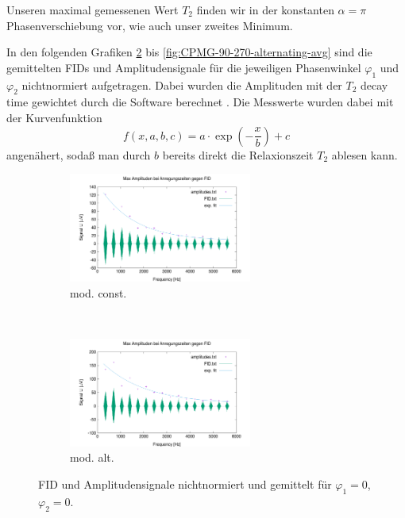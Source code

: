 \documentclass[../../main.tex]{subfiles}
\begin{document}
            Unseren maximal gemessenen Wert $T_2$ finden wir in der konstanten $\alpha = \pi$ Phasenverschiebung vor, wie auch unser zweites Minimum.

            In den folgenden Grafiken \ref{fig:CPMG-0-0-alternating-avg} bis \ref{fig:CPMG-90-270-alternating-avg} sind die gemittelten FIDs und Amplitudensignale für die jeweiligen Phasenwinkel $\varphi_1$ und $\varphi_2$ nichtnormiert aufgetragen. Dabei wurden die Amplituden mit der $T_2$ decay time gewichtet durch die Software berechnet \cite[ch 5.3.1]{doc:EFNMRStudentManual}. Die Messwerte wurden dabei mit der Kurvenfunktion 
            \[
                f(x,a,b,c) = a\cdot \exp(-\frac{x}{b}) + c
            \]
            angenähert, sodaß man durch $b$ bereits direkt die Relaxionszeit $T_2$ ablesen kann. 
        \begin{figure}[H]
            \centering
            \begin{subfigure}[b]{0.4\textwidth}
                \centering
                \includegraphics[width=6cm]{Bilddateien/10/CPMG-0-0-constant-avg.png}
                \caption{mod. const.}
                \label{fig:CPMG-0-0-constant-avg}
            \end{subfigure}
            \
            \begin{subfigure}[b]{0.4\textwidth}
                \centering
                \includegraphics[width=6cm]{Bilddateien/10/CPMG-0-0-alternating-avg.png}
                \caption{mod. alt.}
                \label{fig:CPMG-0-0-alternating-avg}
            \end{subfigure}
            \caption{FID und Amplitudensignale nichtnormiert und gemittelt für $\varphi_1 = 0$, $\varphi_2 = 0$.}
            \label{fig:CPMG-0-0-avg}
        \end{figure}
\end{document}
